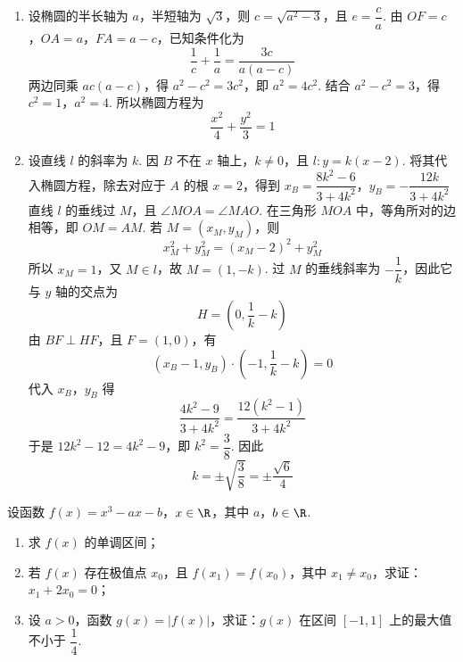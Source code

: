 \begin{solution}
\begin{enumerate}
\item 设椭圆的半长轴为 \(a\)，半短轴为 \(\sqrt3\)，则
\(c=\sqrt{a^2-3}\)，且 \(e=\dfrac ca\). 由
\(OF=c\)，\(OA=a\)，\(FA=a-c\)，已知条件化为
\[
\dfrac1c+\dfrac1a=\dfrac{3c}{a(a-c)}
\]
两边同乘 \(ac(a-c)\)，得
\(a^2-c^2=3c^2\)，即 \(a^2=4c^2\). 结合
\(a^2-c^2=3\)，得 \(c^2=1\)，\(a^2=4\). 所以椭圆方程为
\[
\dfrac{x^2}{4}+\dfrac{y^2}{3}=1
\]

\item 设直线 \(l\) 的斜率为 \(k\). 因 \(B\) 不在 \(x\) 轴上，\(k\ne0\)，且
\(l:y=k(x-2)\). 将其代入椭圆方程，除去对应于 \(A\) 的根 \(x=2\)，得到
\(x_B=\dfrac{8k^2-6}{3+4k^2}\)，\(y_B=-\dfrac{12k}{3+4k^2}\)
直线 \(l\) 的垂线过 \(M\)，且 \(\angle MOA=\angle MAO\). 在三角形
\(MOA\) 中，等角所对的边相等，即 \(OM=AM\). 若
\(M=(x_M,y_M)\)，则
\[
x_M^2+y_M^2=(x_M-2)^2+y_M^2
\]
所以 \(x_M=1\)，又 \(M\in l\)，故 \(M=(1,-k)\). 过 \(M\) 的垂线斜率为
\(-\dfrac1k\)，因此它与 \(y\) 轴的交点为
\[
H=\left(0,\dfrac1k-k\right)
\]
由 \(BF\perp HF\)，且 \(F=(1,0)\)，有
\[
(x_B-1,y_B)\cdot\left(-1,\dfrac1k-k\right)=0
\]
代入 \(x_B\)，\(y_B\) 得
\[
\dfrac{4k^2-9}{3+4k^2}
=\dfrac{12(k^2-1)}{3+4k^2}
\]
于是 \(12k^2-12=4k^2-9\)，即 \(k^2=\dfrac38\). 因此
\[
k=\pm\sqrt{\dfrac38}=\pm\dfrac{\sqrt6}{4}
\]
\end{enumerate}
\end{solution}

\begin{problem}
设函数 \( f(x)=x^3-ax-b \)，\( x\in \R \)，其中 \(a\)，\(b\in \R\).

\begin{enumerate}
\item 求 \( f(x) \) 的单调区间；
\item 若 \( f(x) \) 存在极值点 \( x_0 \)，且 \( f(x_1)=f(x_0) \)，其中 \( x_1\ne x_0 \)，求证：\( x_1+2x_0=0 \)；
\item 设 \( a>0 \)，函数 \( g(x)=|f(x)| \)，求证：\( g(x) \) 在区间 \( [-1,1] \) 上的最大值不小于 \( \dfrac14 \).
\end{enumerate}
\end{problem}

